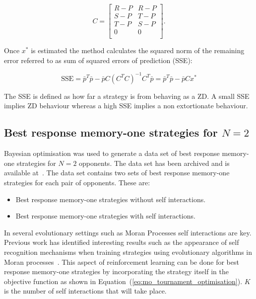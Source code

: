\begin{equation}\label{eq:definition_of_C}
    C =
    \begin{bmatrix}
        R - P & R- P \\
        S - P & T- P \\
        T - P & S- P \\
        0     & 0 \\
    \end{bmatrix}.
\end{equation}

Once \(x^*\) is estimated the method calculates the squared norm of the
remaining error referred to as sum of squared errors of prediction (SSE):

\begin{equation}\label{eqn:x_SSError_formula}
    \text{SSE} = {\bar{p}} ^ T \bar{p} -
           \bar{p} C \left(C ^ T C \right) ^ {-1} C ^ T \bar{p}
         = {\bar{p}} ^ T \bar{p} - \bar{p} C x ^ *
\end{equation}

The SSE is defined as how far a strategy is from behaving as a ZD. A small SSE
implies ZD behaviour whereas a high SSE implies a non extortionate behaviour.

\subsection{Best response memory-one strategies for \(N=2\)}\label{subsection:best_response_n_2}

Bayesian optimisation was used to generate a data set of best response
memory-one strategies for \(N=2\) opponents. The data set has been archived and
is available at~\cite{glynatsi2019}. The data set contains two sets of best
response memory-one strategies for each pair of opponents. These are:

\begin{itemize}
    \item Best response memory-one strategies without self interactions.
    \item Best response memory-one strategies with self interactions.
\end{itemize}

In several evolutionary settings such as Moran Processes self interactions are
key. Previous work has identified interesting results such as the appearance of
self recognition mechanisms when training strategies using evolutionary
algorithms in Moran processes~\cite{Knight2018}. This aspect of reinforcement
learning can be done for best response memory-one strategies by incorporating
the strategy itself in the objective function as shown in
Equation~(\ref{eq:mo_tournament_optimisation}). \(K\) is the number of self
interactions that will take place.


